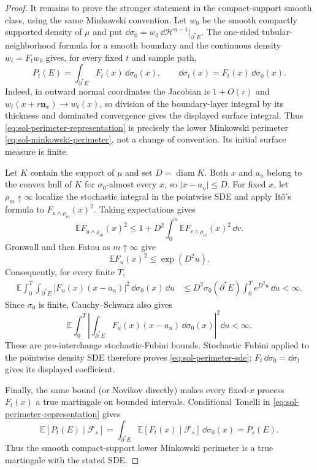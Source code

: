 \documentclass[../main.tex]{subfiles}
\begin{document}
\begin{proof}
It remains to prove the stronger statement in the compact-support smooth class, using the same
Minkowski convention.  Let $w_0$ be the smooth compactly supported density of $\mu$ and put
$\dd\sigma_0=w_0\,\dd\mathcal H^{n-1}|_{\partial^*E}$.  The one-sided tubular-neighborhood
formula for a smooth boundary and the continuous density $w_t=F_tw_0$ gives, for every fixed
$t$ and sample path,
\begin{equation}
  P_t(E)=\int_{\partial^*E}F_t(x)\,\dd\sigma_0(x),
  \qquad
  \dd\sigma_t(x)=F_t(x)\,\dd\sigma_0(x).
  \label{eq:sol-perimeter-representation}
\end{equation}
Indeed, in outward normal coordinates the Jacobian is $1+O(r)$ and
$w_t(x+r\mathbf n_x)\to w_t(x)$, so division of the boundary-layer integral by its thickness
and dominated convergence gives the displayed surface integral.  Thus
\eqref{eq:sol-perimeter-representation} is precisely the lower Minkowski perimeter
\eqref{eq:sol-minkowski-perimeter}, not a change of convention.  Its initial surface measure is
finite.

Let $K$ contain the support of $\mu$ and set $D=\operatorname{diam}K$.  Both $x$ and $a_u$
belong to the convex hull of $K$ for $\sigma_0$-almost every $x$, so $|x-a_u|\leq D$.  For fixed
$x$, let $\rho_m\uparrow\infty$ localize the stochastic integral in the pointwise SDE and apply It\^o's
formula to $F_{u\wedge\rho_m}(x)^2$.  Taking expectations gives
\[
  \mathbb E F_{u\wedge\rho_m}(x)^2
  \leq 1+D^2\int_0^u\mathbb E F_{v\wedge\rho_m}(x)^2\,\dd v.
\]
Gronwall and then Fatou as $m\uparrow\infty$ give
\begin{equation}
  \mathbb E F_u(x)^2\leq \exp(D^2u).
  \label{eq:sol-density-L2}
\end{equation}
Consequently, for every finite $T$,
\begin{align*}
  \mathbb E\int_0^T\int_{\partial^*E}
    |F_u(x)(x-a_u)|^2\,\dd\sigma_0(x)\,\dd u
  &\leq D^2\sigma_0(\partial^*E)\int_0^T e^{D^2u}\,\dd u<\infty.
\end{align*}
Since $\sigma_0$ is finite, Cauchy--Schwarz also gives
\[
  \mathbb E\int_0^T
  \left|\int_{\partial^*E}F_u(x)(x-a_u)\,\dd\sigma_0(x)\right|^2\dd u<\infty.
\]
These are pre-interchange stochastic-Fubini bounds.  Stochastic Fubini applied to the pointwise
density SDE therefore proves \eqref{eq:sol-perimeter-sde};
$F_t\,\dd\sigma_0=\dd\sigma_t$ gives its displayed coefficient.

Finally, the same bound (or Novikov directly) makes every fixed-$x$ process $F_t(x)$ a true
martingale on bounded intervals.  Conditional Tonelli in
\eqref{eq:sol-perimeter-representation} gives
\[
  \mathbb E[P_t(E)\mid\mathcal F_s]
  =\int_{\partial^*E}\mathbb E[F_t(x)\mid\mathcal F_s]\,\dd\sigma_0(x)
  =P_s(E).
\]
Thus the smooth compact-support lower Minkowski perimeter is a true martingale with the stated
SDE.
\end{proof}
\end{document}
